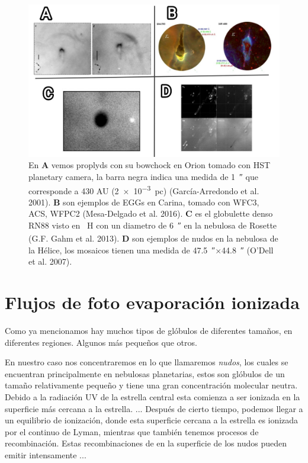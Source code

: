 \documentclass{book}
\begin{document}
\begin{figure}[h]
    \centering
    \includegraphics[width=1 \textwidth]{images Chapter 1/C1_Globulettes.jpg}
    \caption{En \textbf{A} vemos proplyds con su bowchock en Orion tomado con HST planetary camera, la barra negra indica una medida de \SI{1}{\arcsecond} que corresponde a 430 AU (\SI{2e-3}{pc}) (García-Arredondo et al. 2001). \textbf{B} son ejemplos de EGGs en Carina, tomado con WFC3, ACS, WFPC2 (Mesa-Delgado et al. 2016). \textbf{C} es el globulette denso RN88 visto en \SI{}{H_\alpha} con un diametro de \SI{6}{\arcsecond} en la nebulosa de Rosette (G.F. Gahm et al. 2013). \textbf{D} son ejemplos de nudos en la nebulosa de la Hélice, los mosaicos tienen una medida de \SI{47.5}{\arcsecond}$\times$\SI{44.8}{\arcsecond} (O'Dell et al. 2007). }
    \label{fig:zones}
\end{figure}


\section{Flujos de foto evaporación ionizada}

Como ya mencionamos hay muchos tipos de glóbulos de diferentes tamaños, en diferentes regiones. Algunos más pequeños que otros. 

En nuestro caso nos concentraremos en lo que llamaremos \textit{nudos}, los cuales se encuentran principalmente en nebulosas planetarias, estos son glóbulos de un tamaño relativamente pequeño y tiene una gran concentración molecular neutra. Debido a la radiación UV de la estrella central esta comienza a ser ionizada en la superficie más cercana a la estrella. ...
Después de cierto tiempo, podemos llegar a un equilibrio de ionización, donde esta superficie cercana a la estrella es ionizada por el continuo de Lyman, mientras que también tenemos procesos de recombinación. Estas recombinaciones de en la superficie de los nudos pueden emitir intensamente ...
\end{document}
